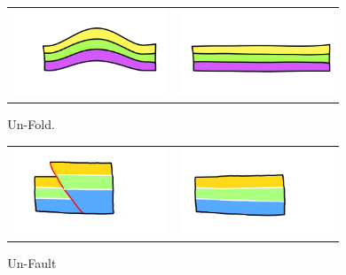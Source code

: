\documentclass{beamer}
\begin{document}
\begin{frame}
\begin{columns}
\begin{column}{0.55\textwidth}
\begin{figure}[H]
\begin{tabular}{@{}ccc@{}}
	\end{tabular}
	\caption{Un-Erode}
	\label{unerodecveg}
	\end{figure}
	\end{column}
	\begin{column}{0.55\textwidth}
	\begin{figure}[H]
	\centering
	\begin{tabular}{@{}cc@{}}
	\includegraphics[width=.35\textwidth]{unFoldDescription0.png}&
	\includegraphics[width=.35\textwidth]{unFoldDescription1.png}\\
	\end{tabular}
	\caption{Un-Fold.}
	\label{unfoldeg}
	\end{figure}
	\begin{figure}[H]
	\centering
	\begin{tabular}{@{}cc@{}}
	\includegraphics[width=.35\textwidth]{unFaultDescription0.png}&
	\includegraphics[width=.35\textwidth]{unFaultDescription1.png}\\
	\end{tabular}
	\caption{Un-Fault}
	\label{unfaulteg}
	\end{figure}
	\end{column}
	\end{columns}
	\end{frame}	
		
\end{document}
